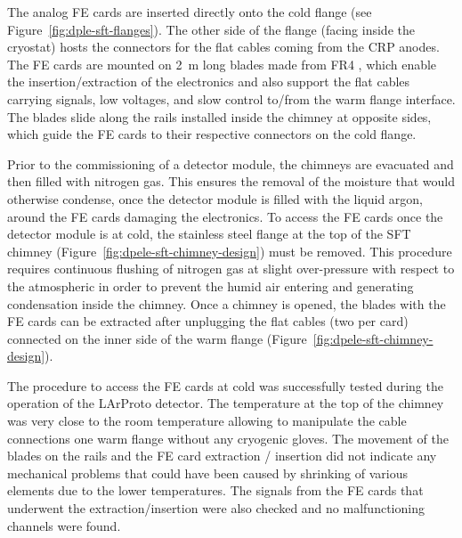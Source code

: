 The analog FE cards are inserted directly onto the cold flange (see Figure~\ref{fig:dple-sft-flanges}). The other side of the flange (facing inside the cryostat) hosts the connectors for the flat cables coming from the CRP anodes.  The FE cards are mounted on \SI{2}{m} long blades made from FR4 , which enable the insertion/extraction of the electronics and also support the flat cables carrying signals, low voltages, and slow control to/from the warm flange interface.  The blades slide along the rails installed inside the chimney at opposite sides, which guide the FE cards to their respective connectors on the cold flange. 

Prior to the commissioning of a detector module, the chimneys are evacuated and then filled with nitrogen gas. This ensures the removal of the moisture that would otherwise condense, once the detector module is filled with the liquid argon, around the FE cards damaging the electronics. To access the FE cards once the detector module is at cold, the stainless steel flange at the top of the SFT chimney (Figure~\ref{fig:dpele-sft-chimney-design}) must be removed. This procedure requires continuous flushing of nitrogen gas at slight over-pressure with respect to the atmospheric in order to prevent the humid air entering and generating condensation inside the chimney. Once a chimney is opened, the blades with the FE cards can be extracted after unplugging the flat cables (two per card) connected on the inner side of the warm flange (Figure~\ref{fig:dpele-sft-chimney-design}).

The procedure to access the FE cards at cold was successfully tested during the operation of the LArProto detector. The temperature at the top of the chimney was very close to the room temperature allowing to manipulate the cable connections one warm flange without any cryogenic gloves. The movement of the blades on the rails and the FE card extraction / insertion did not indicate any mechanical problems that could have been caused by shrinking of various elements due to the lower temperatures.  The signals from the FE cards that underwent the extraction/insertion were also checked and no malfunctioning channels were found.


